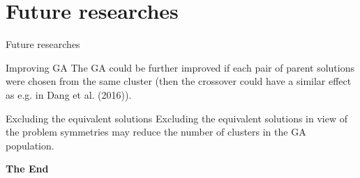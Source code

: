\documentclass[aspectratio=169,xcolor=dvipsnames]{beamer}
\begin{document}
\section{Future researches}

\begin{frame}{Future researches}
        \begin{block}{Improving GA}
The GA could be further improved if each pair of parent solutions were chosen from the same cluster (then the crossover could have a similar effect as e.g. in Dang et al. (2016)).
    \end{block}
    \vspace{1cm}	
            \begin{block}{Excluding the equivalent solutions}
Excluding the equivalent solutions in view of the problem symmetries may 
reduce the number of clusters in the GA population.    
    \end{block}
 \end{frame}


\begin{frame}
    \Huge{\centerline{\textbf{The End}}}
\end{frame}

\end{document}
